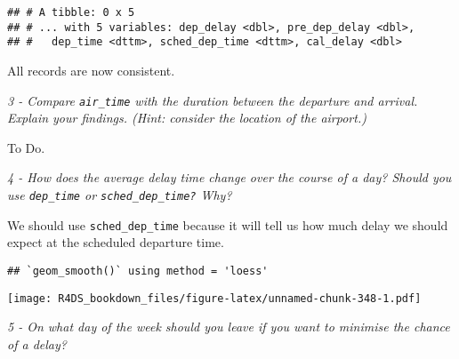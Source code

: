 \documentclass[]{article}
\newenvironment{Shaded}{\begin{snugshade}}{\end{snugshade}}
\newcommand{\KeywordTok}[1]{\textcolor[rgb]{0.13,0.29,0.53}{\textbf{#1}}}
\newcommand{\DataTypeTok}[1]{\textcolor[rgb]{0.13,0.29,0.53}{#1}}
\newcommand{\StringTok}[1]{\textcolor[rgb]{0.31,0.60,0.02}{#1}}
\newcommand{\OtherTok}[1]{\textcolor[rgb]{0.56,0.35,0.01}{#1}}
\newcommand{\OperatorTok}[1]{\textcolor[rgb]{0.81,0.36,0.00}{\textbf{#1}}}
\newcommand{\NormalTok}[1]{#1}
\theoremstyle{definition}
\theoremstyle{definition}
\theoremstyle{definition}
\theoremstyle{remark}
\begin{document}
\begin{verbatim}
## # A tibble: 0 x 5
## # ... with 5 variables: dep_delay <dbl>, pre_dep_delay <dbl>,
## #   dep_time <dttm>, sched_dep_time <dttm>, cal_delay <dbl>
\end{verbatim}

All records are now consistent.

\emph{3 - Compare \texttt{air\_time} with the duration between the
departure and arrival. Explain your findings. (Hint: consider the
location of the airport.)}

To Do.

\emph{4 - How does the average delay time change over the course of a
day? Should you use \texttt{dep\_time} or \texttt{sched\_dep\_time?}
Why?}

We should use \texttt{sched\_dep\_time} because it will tell us how much
delay we should expect at the scheduled departure time.

\begin{Shaded}
\end{Shaded}

\begin{verbatim}
## `geom_smooth()` using method = 'loess'
\end{verbatim}

\texttt{[image: R4DS\_bookdown\_files/figure-latex/unnamed-chunk-348-1.pdf]}

\emph{5 - On what day of the week should you leave if you want to
minimise the chance of a delay?}
\end{document}
